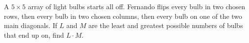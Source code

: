 A $5\times5$ array of light bulbs starts all off. Fernando flips every bulb in two chosen rows, then every bulb in two chosen columns, then every bulb on one of the two main diagonals. If $L$ and $M$ are the least and greatest possible numbers of bulbs that end up on, find $L\cdot M$.

